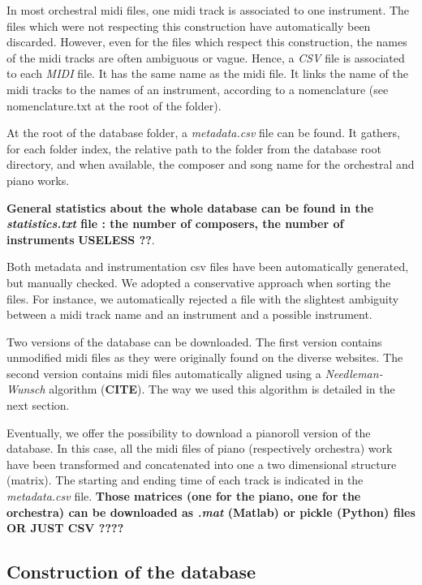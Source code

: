 \documentclass[twoside,twocolumn]{article}
\begin{document}
In most orchestral midi files, one midi track is associated to one instrument. The files which were not respecting this construction have automatically been discarded. However, even for the files which respect this construction, the names of the midi tracks are often ambiguous or vague. 
Hence, a \textit{CSV} file is associated to each \textit{MIDI} file. It has the same name as the midi file. It links the name of the midi tracks to the names of an instrument, according to a nomenclature (see nomenclature.txt at the root of the folder).

At the root of the database folder, a \textit{metadata.csv} file can be found. It gathers, for each folder index, the relative path to the folder from the database root directory, and when available, the composer and song name for the orchestral and piano works.

\textbf{General statistics about the whole database can be found in the \textit{statistics.txt} file : the number of composers, the number of instruments} \textbf{USELESS ??}.

Both metadata and instrumentation csv files have been automatically generated, but manually checked. We adopted a conservative approach when sorting the files. For instance, we automatically rejected a file with the slightest ambiguity between a midi track name and an instrument and a possible instrument.

Two versions of the database can be downloaded. The first version contains unmodified midi files as they were originally found on the diverse websites. The second version contains midi files automatically aligned using a \textit{Needleman-Wunsch} algorithm (\textbf{CITE}). The way we used this algorithm is detailed in the next section.

Eventually, we offer the possibility to download a pianoroll version of the database. In this case, all the midi files of piano (respectively orchestra) work have been transformed and concatenated into one a two dimensional structure (matrix). The starting and ending time of each track is indicated in the \textit{metadata.csv} file. \textbf{Those matrices (one for the piano, one for the orchestra) can be downloaded as \textit{.mat} (Matlab) or pickle (Python) files OR JUST CSV ????}

\subsection{Construction of the database}
\end{document}
